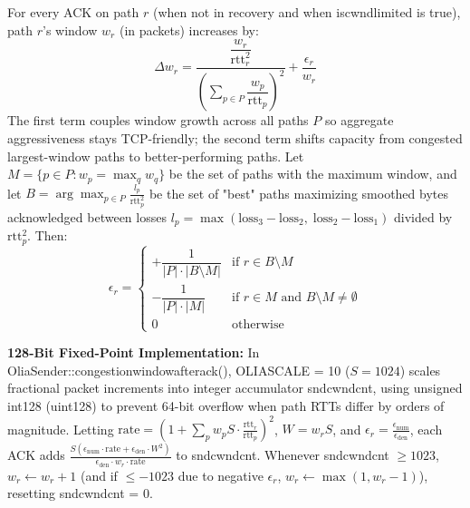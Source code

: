 \documentclass[10pt,a4paper]{article}
\newcommand{\codeul}{\textunderscore\hspace{0pt}}
\DeclareRobustCommand{\code}[1]{{\ttfamily\let\_\codeul #1}}
\begin{document}
For every ACK on path $r$ (when not in recovery and when \code{is\_cwnd\_limited} is true), path $r$'s window $w_r$ (in packets) increases by:
\begin{equation}
    \Delta w_r = \frac{\dfrac{w_r}{\text{rtt}_r^2}}{\left(\displaystyle\sum_{p \in P} \dfrac{w_p}{\text{rtt}_p}\right)^2} + \frac{\epsilon_r}{w_r}
    \label{eq:olia}
\end{equation}
The first term couples window growth across all paths $P$ so aggregate aggressiveness stays TCP-friendly; the second term shifts capacity from congested largest-window paths to better-performing paths. Let $M = \{p \in P : w_p = \max_q w_q\}$ be the set of paths with the maximum window, and let $B = \arg\max_{p \in P} \frac{l_p}{\text{rtt}_p^2}$ be the set of "best" paths maximizing smoothed bytes acknowledged between losses $l_p = \max(\text{loss}_3 - \text{loss}_2,\; \text{loss}_2 - \text{loss}_1)$ divided by $\text{rtt}_p^2$. Then:
\begin{equation}
    \epsilon_r =
    \begin{cases}
        +\dfrac{1}{|P| \cdot |B \setminus M|} & \text{if } r \in B \setminus M \\[6pt]
        -\dfrac{1}{|P| \cdot |M|} & \text{if } r \in M \text{ and } B \setminus M \neq \emptyset \\[6pt]
        0 & \text{otherwise}
    \end{cases}
\end{equation}

\textbf{128-Bit Fixed-Point Implementation:}
In \code{OliaSender::congestion\_window\_after\_ack()}, \code{OLIA\_SCALE = 10} ($S = 1024$) scales fractional packet increments into integer accumulator \code{snd\_cwnd\_cnt}, using \code{unsigned \_\_int128} (\code{uint128}) to prevent 64-bit overflow when path RTTs differ by orders of magnitude. Letting $\text{rate} = \left(1 + \sum_p w_p S \cdot \frac{\text{rtt}_r}{\text{rtt}_p}\right)^2$, $W = w_r S$, and $\epsilon_r = \frac{\epsilon_{\text{num}}}{\epsilon_{\text{den}}}$, each ACK adds $\frac{S(\epsilon_{\text{num}}\cdot \text{rate} + \epsilon_{\text{den}}\cdot W^2)}{\epsilon_{\text{den}} \cdot w_r \cdot \text{rate}}$ to \code{snd\_cwnd\_cnt}. Whenever \code{snd\_cwnd\_cnt} $\ge 1023$, $w_r \leftarrow w_r + 1$ (and if $\le -1023$ due to negative $\epsilon_r$, $w_r \leftarrow \max(1, w_r - 1)$), resetting \code{snd\_cwnd\_cnt = 0}.
\end{document}
